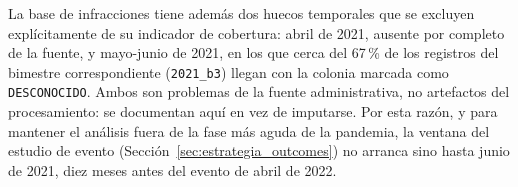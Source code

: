 La base de infracciones tiene además dos huecos temporales que se excluyen
explícitamente de su indicador de cobertura: abril de 2021, ausente por
completo de la fuente, y mayo-junio de 2021, en los que cerca del 67\,\% de
los registros del bimestre correspondiente (\texttt{2021\_b3}) llegan con la
colonia marcada como \texttt{DESCONOCIDO}. Ambos son problemas de la fuente
administrativa, no artefactos del procesamiento: se documentan aquí en vez de
imputarse. Por esta razón, y para mantener el análisis fuera de la fase más
aguda de la pandemia, la ventana del estudio de evento
(Sección~\ref{sec:estrategia_outcomes}) no arranca sino hasta junio de 2021,
diez meses antes del evento de abril de 2022.
